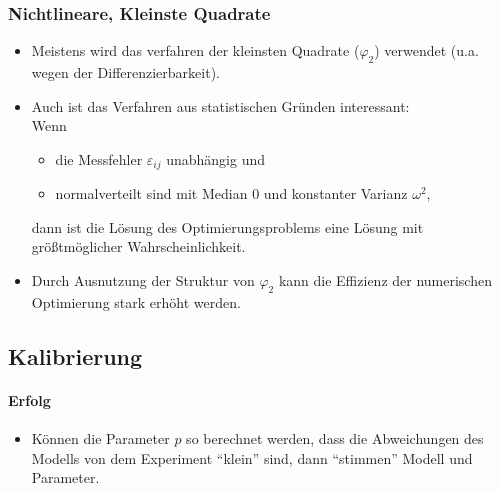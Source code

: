 \documentclass[a4paper, 11pt, accentcolor = tud3b]{tudreport}
\begin{document}
                \subsubsection{Nichtlineare, Kleinste Quadrate} %
                    \begin{itemize}
                    	\item Meistens wird das verfahren der kleinsten Quadrate (\( \varphi _ 2 \)) verwendet (u.a. wegen der Differenzierbarkeit).
                    	\item Auch ist das Verfahren aus statistischen Gründen interessant: \\ Wenn
	                    	\begin{itemize}
	                    		\item die Messfehler \( \varepsilon _ {ij} \) unabhängig und
	                    		\item normalverteilt sind mit Median \(0\) und konstanter Varianz \( \omega^2 \),
	                    	\end{itemize}
	                    	dann ist die Lösung des Optimierungsproblems eine Lösung mit größtmöglicher Wahrscheinlichkeit.
	                    \item Durch Ausnutzung der Struktur von \( \varphi _ 2 \) kann die Effizienz der numerischen Optimierung stark erhöht werden.
                    \end{itemize}

            \subsection{Kalibrierung} %
                \paragraph{Erfolg}
	                \begin{itemize}
	                	\item Können die Parameter \(p\) so berechnet werden, dass die Abweichungen des Modells von dem Experiment \enquote{klein} sind, dann \enquote{stimmen} Modell und Parameter.
                	\end{itemize}
                
\end{document}

